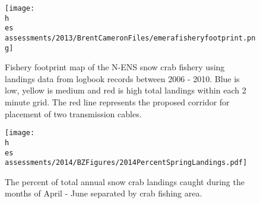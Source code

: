 \documentclass[11pt]{article}
\newcommand{\D}{.}
\newcommand{\h}{/home/hubleyb/}
\newcommand{\es}{bio.data/bio.snowcrab/}
\begin{document}
%


\begin{figure}
\centering
\texttt{[image: \\h \\es assessments/2013/BrentCameronFiles/emerafisheryfootprint.png]}
\caption{Fishery footprint map of the N-ENS snow crab fishery using landings data from logbook records between 2006 - 2010. Blue is low, yellow is medium and red is high total landings within each 2 minute grid. The red line represents the proposed corridor for placement of two transmission cables.  }
\end{figure}
\clearpage
\begin{figure}
\centering
\texttt{[image: \\h \\es assessments/2014/BZFigures/2014PercentSpringLandings.pdf]}
\caption{The percent of total annual snow crab landings caught during the months of April - June separated by crab fishing area.}
\end{figure}
\clearpage
\end{document}
